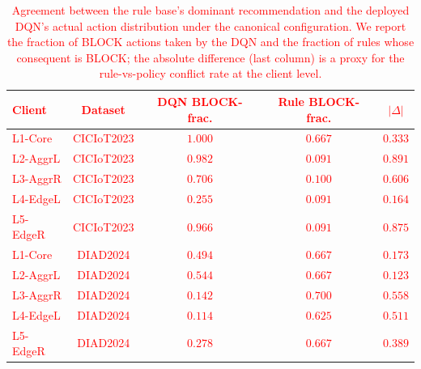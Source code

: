 \documentclass[journal]{IEEEtran}
\newcommand{\rev}[1]{\textcolor{red}{#1}}
\begin{document}
\begin{table}[!htbp]
\centering
\rev{\caption{Agreement between the rule base's dominant recommendation and the deployed DQN's actual action distribution under the canonical configuration. We report the fraction of BLOCK actions taken by the DQN and the fraction of rules whose consequent is BLOCK; the absolute difference (last column) is a proxy for the rule-vs-policy conflict rate at the client level.}\label{tab:rule_dqn_agreement}}
\rev{\small
\begin{tabular}{@{}lcccc@{}}
\toprule
\textbf{Client} & \textbf{Dataset} & \textbf{DQN BLOCK-frac.} & \textbf{Rule BLOCK-frac.} & \textbf{$|\Delta|$} \\
\midrule
L1-Core   & CICIoT2023 & $1.000$ & $0.667$ & $0.333$ \\
L2-AggrL  & CICIoT2023 & $0.982$ & $0.091$ & $0.891$ \\
L3-AggrR  & CICIoT2023 & $0.706$ & $0.100$ & $0.606$ \\
L4-EdgeL  & CICIoT2023 & $0.255$ & $0.091$ & $0.164$ \\
L5-EdgeR  & CICIoT2023 & $0.966$ & $0.091$ & $0.875$ \\
\midrule
L1-Core   & DIAD2024   & $0.494$ & $0.667$ & $0.173$ \\
L2-AggrL  & DIAD2024   & $0.544$ & $0.667$ & $0.123$ \\
L3-AggrR  & DIAD2024   & $0.142$ & $0.700$ & $0.558$ \\
L4-EdgeL  & DIAD2024   & $0.114$ & $0.625$ & $0.511$ \\
L5-EdgeR  & DIAD2024   & $0.278$ & $0.667$ & $0.389$ \\
\bottomrule
\end{tabular}}
\end{table}
\end{document}

